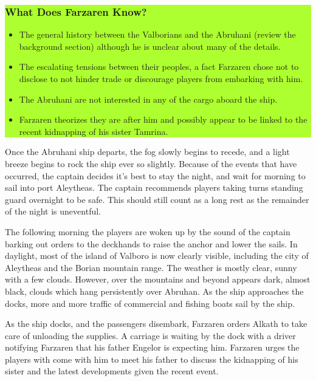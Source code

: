 \begin{multicols*}{2}
\colorbox{GreenYellow}{\begin{minipage}{0.4\textwidth}
	\subsubsection*{What Does Farzaren Know?}
	\begin{itemize}
		\item The general history between the Valborians and the Abruhani (review the background section) although he is unclear about many of the details.
		\item The escalating tensions between their peoples, a fact Farzaren chose not to disclose to not hinder trade or discourage players from embarking with him.
		\item The Abruhani are not interested in any of the cargo aboard the ship. 
		\item Farzaren theorizes they are after him and possibly appear to be linked to the recent kidnapping of his sister Tamrina.
	\end{itemize}
\end{minipage}}
\break

Once the Abruhani ship departs, the fog slowly begins to recede, and a light breeze begins to rock the ship ever so slightly. Because of the events that have occurred, the captain decides it’s best to stay the night, and wait for morning to sail into port Aleytheas. The captain recommends players taking turns standing guard overnight to be safe. This should still count as a long rest as the remainder of the night is uneventful.

The following morning the players are woken up by the sound of the captain barking out orders to the deckhands to raise the anchor and lower the sails. In daylight, most of the island of Valboro is now clearly visible, including the city of Aleytheas and the Borian mountain range. The weather is mostly clear, sunny with a few clouds. However, over the mountains and beyond appears dark, almost black, clouds which hang persistently over Abruhan. As the ship approaches the docks, more and more traffic of commercial and fishing boats sail by the ship.

As the ship docks, and the passengers disembark, Farzaren orders Alkath to take care of unloading the supplies. A carriage is waiting by the dock with a driver notifying Farzaren that his father Engelor is expecting him. Farzaren urges the players with come with him to meet his father to discuss the kidnapping of his sister and the latest developments given the recent event. 


\end{multicols*}
